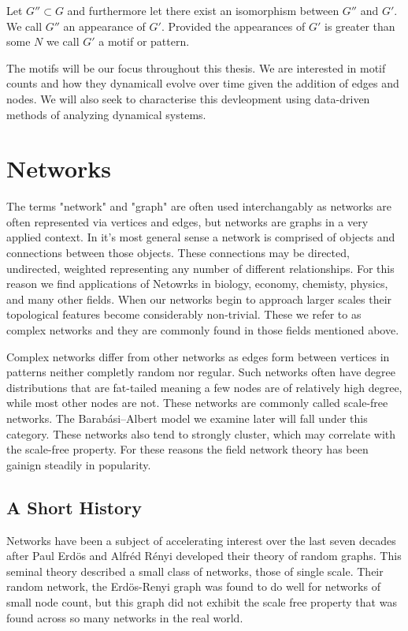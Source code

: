 \begin{dfn}
    Let $G'' \subset G$ and furthermore let there exist an isomorphism between $G''$ and $G'$. We call
    $G''$ an appearance of $G'$. Provided the appearances of $G'$ is greater than some $N$ we call $G'$
    a motif or pattern.
\end{dfn}

The motifs will be our focus throughout this thesis. We are interested in motif counts and how they
dynamicall evolve over time given the addition of edges and nodes. We will also seek to characterise this
devleopment using data-driven methods of analyzing dynamical systems.

\chapter{Networks}
The terms "network" and "graph" are often used interchangably as networks are often represented
via vertices and edges, but networks are graphs in a very applied context. In it's 
most general sense a network is comprised of objects and connections between those objects. These
connections may be directed, undirected, weighted representing any number of different relationships. 
For this reason we find applications of Netowrks in biology, economy, chemisty, physics, and 
many other fields. When our networks begin to approach larger scales their topological features
become considerably non-trivial. These we refer to as complex networks and they are 
commonly found in those fields mentioned above. 

Complex networks differ from other networks as edges form between vertices 
in patterns neither completly random nor regular. Such networks often have degree distributions that are fat-tailed
meaning a few nodes are of relatively high degree, while most other nodes are not. These networks
are commonly called scale-free networks. The Barabási–Albert model we examine later will fall under
this category. These networks also tend to strongly cluster, which may correlate with the scale-free 
property. For these reasons the field network theory has been gainign steadily in popularity.

\section{A Short History}

\vspace{3mm}
Networks have been a subject of accelerating interest over the last seven decades after
Paul Erdös and Alfréd Rényi developed their theory of random graphs. This 
seminal theory described a small class of networks, those of single scale. Their
random network, the Erdös-Renyi graph was found to do well for networks of small node count,
but this graph did not exhibit the scale free property that was found across so many networks
in the real world. 


